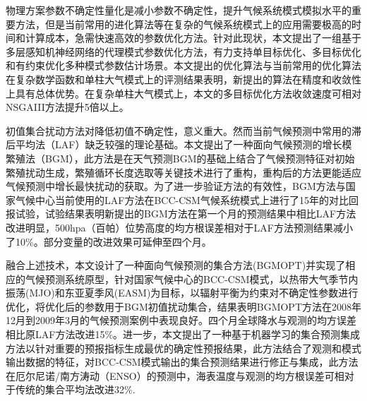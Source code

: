 \begin{cabstract}

物理方案参数不确定性量化是减小参数不确定性，提升气候系统模式模拟水平的重要方法，但是当前常用的进化算法等在复杂的气候系统模式上的应用需要极高的时间和计算成本，急需快速高效的参数优化方法。针对此现状，本文提出了一组基于多层感知机神经网络的代理模式参数优化方法，有力支持单目标优化、多目标优化和有约束优化多种模式参数估计场景。本文提出的优化算法与当前常用的优化算法在复杂数学函数和单柱大气模式上的评测结果表明，新提出的算法在精度和收敛性上具有总体优势。在复杂单柱大气模式上，本文的多目标优化方法收敛速度可相对NSGAIII方法提升5倍以上。

初值集合扰动方法对降低初值不确定性，意义重大。然而当前气候预测中常用的滞后平均法（LAF）缺乏较强的理论基础。本文提出了一种面向气候预测的增长模繁殖法（BGM），此方法是在天气预测BGM的基础上结合了气候预测特征对初始繁殖扰动生成，繁殖循环长度选取等关键技术进行了重构，重构后的方法更能适应气候预测中增长最快扰动的获取。为了进一步验证方法的有效性，BGM方法与国家气候中心当前使用的LAF方法在BCC-CSM气候系统模式上进行了15年的对比回报试验，试验结果表明新提出的BGM方法在第一个月的预测结果中相比LAF方法改进明显，500hpa（百帕）位势高度的均方根误差相对于LAF方法预测结果减小了10\%。部分变量的改进效果可延伸至四个月。

融合上述技术，本文设计了一种面向气候预测的集合方法(BGMOPT)并实现了相应的气候预测系统原型，针对国家气候中心的BCC-CSM模式，以热带大气季节内振荡(MJO)和东亚夏季风(EASM)为目标，以辐射平衡为约束对不确定性参数进行优化，将优化后的参数用于BGM初值扰动集合，结果表明BGMOPT方法在2008年12月到2009年3月的气候预测案例中表现良好。四个月全球降水与观测的均方误差相比原LAF方法改进15\%。进一步，本文提出了一种基于机器学习的集合预测集成方法以针对重要的预报指标生成最优的确定性预报结果，此方法结合了观测和模式输出数据的特征，对BCC-CSM模式输出的集合预测结果进行修正与集成，此方法在厄尔尼诺/南方涛动（ENSO）的预测中，海表温度与观测的均方根误差可相对于传统的集合平均法改进32\%.

\end{cabstract}

